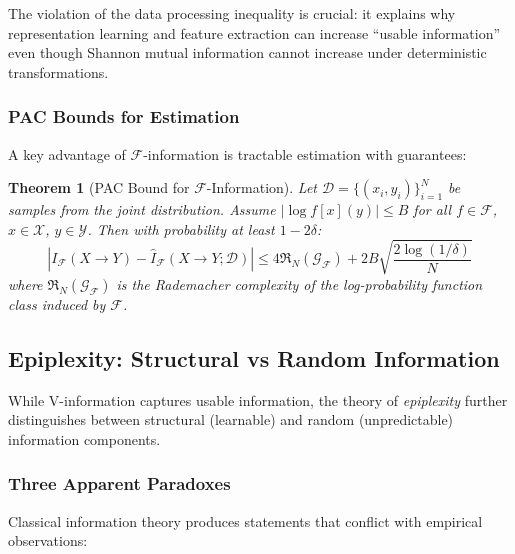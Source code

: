 \documentclass[11pt]{article}
\newtheorem{theorem}{Theorem}[section]
\newcommand{\X}{\mathcal{X}}
\newcommand{\Y}{\mathcal{Y}}
\newcommand{\F}{\mathcal{F}}
\newcommand{\D}{\mathcal{D}}
\begin{document}
The violation of the data processing inequality is crucial: it explains why representation learning and feature extraction can increase ``usable information'' even though Shannon mutual information cannot increase under deterministic transformations.

\subsubsection{PAC Bounds for Estimation}

A key advantage of $\F$-information is tractable estimation with guarantees:

\begin{theorem}[PAC Bound for $\F$-Information]
Let $\D = \{(x_i, y_i)\}_{i=1}^N$ be samples from the joint distribution. Assume $|\log f[x](y)| \leq B$ for all $f \in \F$, $x \in \X$, $y \in \Y$. Then with probability at least $1-2\delta$:
\begin{equation}
\left|I_\F(X \to Y) - \hat{I}_\F(X \to Y; \D)\right| \leq 4\mathfrak{R}_N(\mathcal{G}_\F) + 2B\sqrt{\frac{2\log(1/\delta)}{N}}
\end{equation}
where $\mathfrak{R}_N(\mathcal{G}_\F)$ is the Rademacher complexity of the log-probability function class induced by $\F$.
\end{theorem}

\subsection{Epiplexity: Structural vs Random Information}

While V-information captures usable information, the theory of \emph{epiplexity} further distinguishes between structural (learnable) and random (unpredictable) information components.

\subsubsection{Three Apparent Paradoxes}

Classical information theory produces statements that conflict with empirical observations:
\end{document}
